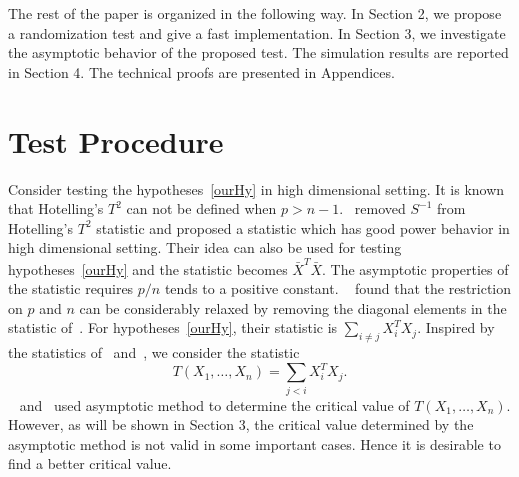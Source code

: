 \documentclass[3p]{elsarticle}
\theoremstyle{plain}
\theoremstyle{definition}
\theoremstyle{remark}
\begin{document}






The rest of the paper is organized in the following way. In Section 2, we propose a randomization test and give a fast implementation.  In Section 3, we investigate the asymptotic behavior of the proposed test. The simulation results are reported in Section 4. The technical proofs are presented in Appendices.




\section{Test Procedure}
Consider testing the hypotheses~\eqref{ourHy} in high dimensional setting.
It is known that Hotelling's $T^2$ can not be defined when $p> n-1$.~\citet{Bai1996Efiect} removed $S^{-1}$ from Hotelling's $T^2$ statistic and proposed a statistic which has good power behavior in high dimensional setting.
Their idea can also be used for testing hypotheses~\eqref{ourHy} and the statistic becomes $\bar{X}^T \bar{X}$.
The asymptotic properties of the statistic requires $p/n$ tends to a positive constant.
 ~\citet{Chen2010A} found that the restriction on $p$ and $n$ can be considerably relaxed by removing the diagonal elements in the statistic of~\citet{Bai1996Efiect}.
 For hypotheses~\eqref{ourHy}, their statistic is $\sum_{i \neq j}X_i^T X_j$.
 Inspired by the statistics of~\citet{Bai1996Efiect} and~\citet{Chen2010A}, we consider the statistic
\begin{equation}\label{Statistic}
    T(X_1,\ldots,X_n)=\sum_{j<i}X_i^T X_j.
\end{equation}
~\citet{Bai1996Efiect} and~\citet{Chen2010A} used asymptotic method to determine the critical value of $T(X_1,\ldots,X_n)$.
However, as will be shown in Section 3, the critical value determined by the asymptotic method is not valid in some important cases.
Hence it is desirable to find a better critical value.
\end{document}
